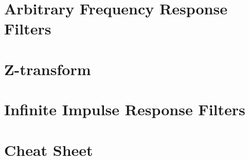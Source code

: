 \documentclass{tufte-book}
\begin{document}
\ifSpFiltering
\chapter{Arbitrary Frequency Response Filters}


 \ifSpExerciseSol
 
 \fi
\fi

\ifSpProgC

\fi

\ifSpZFIR
\chapter{Z-transform}


 \ifSpExerciseSol
 
 \fi
\fi

\ifSpZIIR
\chapter{Infinite Impulse Response Filters}


 \ifSpExerciseSol
 
 \fi
\fi

\chapter{Cheat Sheet}


\backmatter
\printindex
\end{document}
